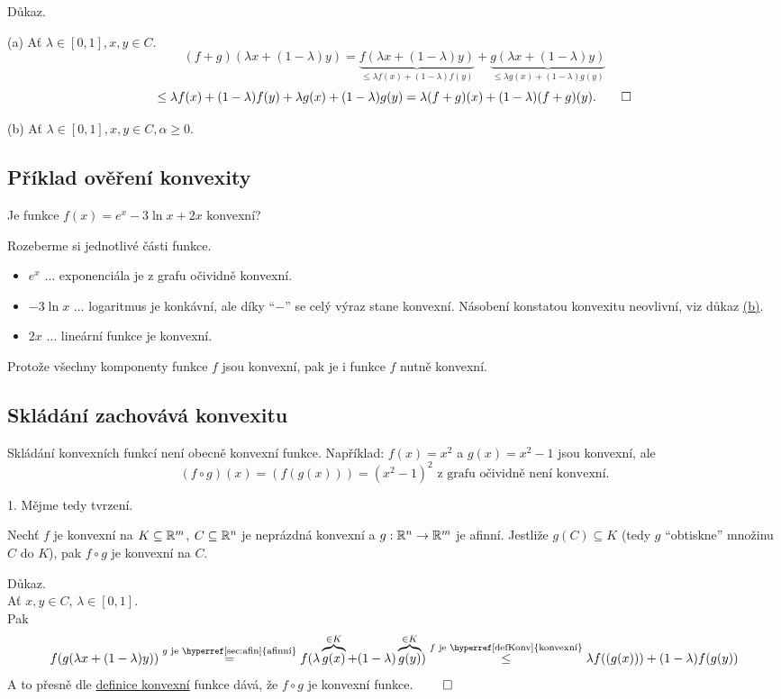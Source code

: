 Důkaz.

(a) Ať $\lambda \in [0,1], x, y \in C$.
\[
    (f+g)(\lambda x + (1-\lambda)y) = \underbrace{f(\lambda x + (1-\lambda)y)}_{\leq \lambda f(x) + (1-\lambda)f(y)} + 
    \underbrace{g(\lambda x + (1-\lambda)y)}_{\leq \lambda g(x) + (1-\lambda)g(y)}
\]
\[
    \leq \lambda f(x) + (1-\lambda)f(y) + \lambda g(x) + (1-\lambda)g(y) = \lambda (f+g)(x) + (1-\lambda)(f+g)(y). \qed
\]

(b) Ať $\lambda \in [0,1], x, y \in C, \alpha \geq 0$. %


\subsection{Příklad ověření konvexity}
Je funkce $f(x) = e^x - 3 \ln x + 2x$ konvexní?

Rozeberme si jednotlivé části funkce.
\begin{itemize}
    \item $e^x$ $\dots$ exponenciála je z grafu očividně konvexní.
    \item $-3 \ln x$ $\dots$ logaritmus je konkávní, ale díky \enquote{$\minus$} se celý výraz stane konvexní. Násobení 
    konstatou konvexitu neovlivní, viz důkaz \hyperref[ssKonv]{(b)}.
    \item $2x$ $\dots$ lineární funkce je konvexní.
\end{itemize}
Protože všechny komponenty funkce $f$ jsou konvexní, pak je i funkce $f$ nutně konvexní.

\subsection{Skládání zachovává konvexitu}
Skládání konvexních funkcí není obecně konvexní funkce. Například: $f(x) = x^2$ a $g(x) = x^2 -1$ jsou konvexní, ale
\[
    (f \circ g)(x) = (f(g(x))) = (x^2 - 1)^2 \text{ z grafu očividně není konvexní.}
\]

1. Mějme tedy tvrzení.

Nechť $f$ je konvexní na $K \subseteq \mathbb{R}^m$, $C \subseteq \mathbb{R}^n$ je neprázdná konvexní a $g : \mathbb{R}^n \rightarrow \mathbb{R}^m$ je 
afinní. Jestliže $g(C) \subseteq K$ (tedy $g$ \enquote{obtiskne} množinu $C$ do $K$), pak $f \circ g$ je konvexní na $C$. \label{skladFun}

Důkaz.\\
Ať $x, y \in C$, $\lambda \in [0,1]$.\\
Pak 
\[
    f(g(\lambda x + (1-\lambda)y)) \stackrel{g \text{ je \hyperref[sec:afin]{afinní}}}{=} f(\lambda \overbrace{g(x)}^{\in K} 
    + (1-\lambda) \overbrace{g(y)}^{\in K})
    \stackrel{f \text{ je \hyperref[defKonv]{konvexní}}}{\leq} \lambda f((g(x))) + (1-\lambda) f(g(y))
\]
A to přesně dle \hyperref[defKonv]{definice konvexní} funkce dává, že $f \circ g$ je konvexní funkce. $\qed$

